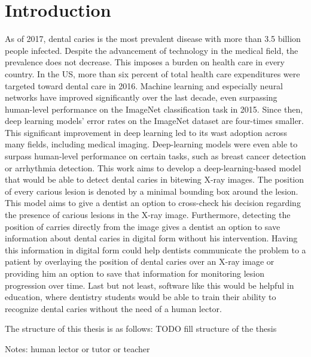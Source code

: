 \chapter{Introduction}

As of 2017, dental caries is the most prevalent disease \cite{Kassebaum2015}\cite{James2018} with more than 3.5 billion people infected. Despite the advancement of technology in the medical field, the prevalence does not decrease. This imposes a burden on health care in every country. In the US, more than six percent of total health care expenditures were targeted toward dental care in 2016\cite{Hung2020}.
\newline
Machine learning and especially neural networks have improved significantly over the last decade, even surpassing human-level performance on the ImageNet classification task in 2015\cite{He2015ICCV}. Since then, deep learning models' error rates on the ImageNet dataset are four-times smaller\cite{paperwithcode}. This significant improvement in deep learning led to its wast adoption across many fields, including medical imaging. Deep-learning models were even able to surpass human-level performance on certain tasks, such as breast cancer detection\cite{RodriguezRuiz2019} or arrhythmia detection\cite{Hannun2019}.
\newline
This work aims to develop a deep-learning-based model that would be able to detect dental caries in bitewing X-ray images. The position of every carious lesion is denoted by a minimal bounding box around the lesion. This model aims to give a dentist an option to cross-check his decision regarding the presence of carious lesions in the X-ray image. Furthermore, detecting the position of carries directly from the image gives a dentist an option to save information about dental caries in digital form without his intervention. Having this information in digital form could help dentists communicate the problem to a patient by overlaying the position of dental caries over an X-ray image or providing him an option to save that information for monitoring lesion progression over time. Last but not least, software like this would be helpful in education, where dentistry students would be able to train their ability to recognize dental caries without the need of a human lector.


The structure of this thesis is as follows: TODO fill structure of the thesis

Notes: human lector or tutor or teacher
